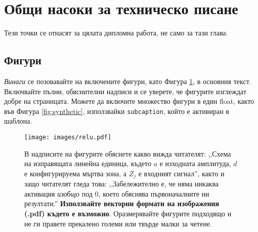 \section{Общи насоки за техническо писане}

Тези точки се отнасят за цялата дипломна работа, не само за тази глава.

\subsection{Фигури}
\emph{Винаги} се позовавайте на включените фигури, като Фигура \cref{fig:relu}, в основния текст. Включвайте пълни, обяснителни надписи и се уверете, че фигурите изглеждат добре на страницата.
Можете да включите множество фигури в един float, както във Фигура \cref{fig:synthetic}, използвайки \texttt{subcaption}, който е активиран в шаблона.


\begin{figure}[htb]
    \centering
    \texttt{[image: images/relu.pdf]}    

    \caption{В надписите на фигурите обяснете какво вижда читателят: ,,Схема на изправящата линейна единица, където $a$ е изходната амплитуда,
    $d$ е конфигурируема мъртва зона, а $Z_j$ е входният сигнал'', както и защо читателят гледа това: 
    ,,Забележително е, че няма никаква активация \emph{изобщо} под 0, което обяснява първоначалните ни резултати.'' 
    \textbf{Използвайте векторни формати на изображения (.pdf) където е възможно}. Оразмерявайте фигурите подходящо и не ги правете прекалено големи или твърде малки за четене.
    }

    \label{fig:relu} 
\end{figure}



